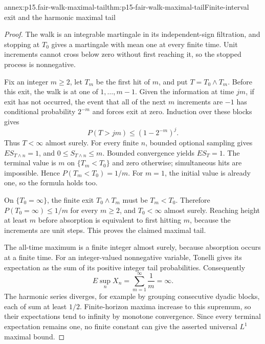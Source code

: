 \begin{annexitem}{annex:p15.fair-walk-maximal-tail}{thm:p15-fair-walk-maximal-tail}{Finite-interval exit and the harmonic maximal tail}
\begin{proof}
The walk is an integrable martingale in its independent-sign
filtration, and stopping at \(T_0\) gives a martingale with mean one
at every finite time. Unit increments cannot cross below zero
without first reaching it, so the stopped process is nonnegative.

Fix an integer \(m\geq2\), let \(T_m\) be the first hit of \(m\),
and put \(T=T_0\wedge T_m\).
Before this exit, the walk is at one of \(1,\ldots,m-1\).
Given the information at time \(jm\), if exit has not occurred,
the event that all of the next \(m\) increments are \(-1\)
has conditional probability \(2^{-m}\) and forces exit at zero.
Induction over these blocks gives
\[
                    P(T>jm)\leq(1-2^{-m})^j .
\]
Thus \(T<\infty\) almost surely.
For every finite \(n\), bounded optional sampling gives
\(ES_{T\wedge n}=1\), and \(0\leq S_{T\wedge n}\leq m\).
Bounded convergence yields \(ES_T=1\).
The terminal value is \(m\) on \(\{T_m<T_0\}\) and zero otherwise;
simultaneous hits are impossible. Hence \(P(T_m<T_0)=1/m\).
For \(m=1\), the initial value is already one, so the formula holds too.

On \(\{T_0=\infty\}\), the finite exit \(T_0\wedge T_m\)
must be \(T_m<T_0\). Therefore \(P(T_0=\infty)\leq1/m\)
for every \(m\geq2\), and \(T_0<\infty\) almost surely.
Reaching height at least \(m\) before absorption is equivalent to
first hitting \(m\), because the increments are unit steps.
This proves the claimed maximal tail.

The all-time maximum is a finite integer almost surely,
because absorption occurs at a finite time. For an integer-valued
nonnegative variable, Tonelli gives its expectation as the sum
of its positive integer tail probabilities. Consequently
\[
                  E\sup_nX_n=\sum_{m=1}^\infty\frac1m=\infty.
\]
The harmonic series diverges, for example by grouping consecutive
dyadic blocks, each of sum at least \(1/2\).
Finite-horizon maxima increase to this supremum, so their
expectations tend to infinity by monotone convergence.
Since every terminal expectation remains one, no finite constant
can give the asserted universal \(L^1\) maximal bound.
\end{proof}
\end{annexitem}

